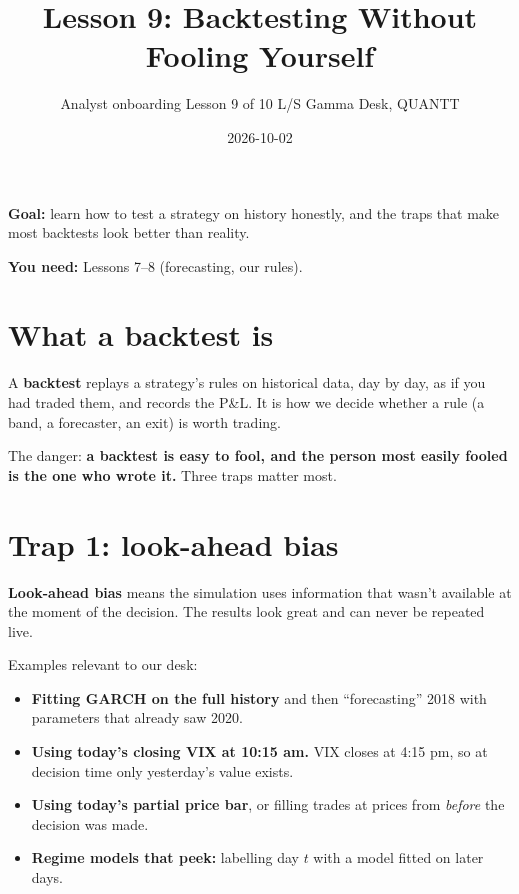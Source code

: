 \documentclass{article}
\title{Lesson 9: Backtesting Without Fooling Yourself}
\author{Analyst onboarding \textperiodcentered{} Lesson 9 of 10 \textperiodcentered{} L/S Gamma Desk, QUANTT}
\date{2026-10-02}
\begin{document}
\maketitle

\textbf{Goal:} learn how to test a strategy on history honestly, and the traps that make most backtests look better than reality.

\textbf{You need:} Lessons 7--8 (forecasting, our rules).

\section{What a backtest is}

A \textbf{backtest} replays a strategy's rules on historical data, day by day, as if you had traded them, and records the P\&L. It is how we decide whether a rule (a band, a forecaster, an exit) is worth trading.

The danger: \textbf{a backtest is easy to fool, and the person most easily fooled is the one who wrote it.} Three traps matter most.

\section{Trap 1: look-ahead bias}

\textbf{Look-ahead bias} means the simulation uses information that wasn't available at the moment of the decision. The results look great and can never be repeated live.

Examples relevant to our desk:

\begin{itemize}

\item \textbf{Fitting GARCH on the full history} and then ``forecasting'' 2018 with parameters that already saw 2020.

\item \textbf{Using today's closing VIX at 10:15 am.} VIX closes at 4:15 pm, so at decision time only yesterday's value exists.

\item \textbf{Using today's partial price bar}, or filling trades at prices from \emph{before} the decision was made.

\item \textbf{Regime models that peek:} labelling day $t$ with a model fitted on later days.

\end{itemize}
\end{document}
